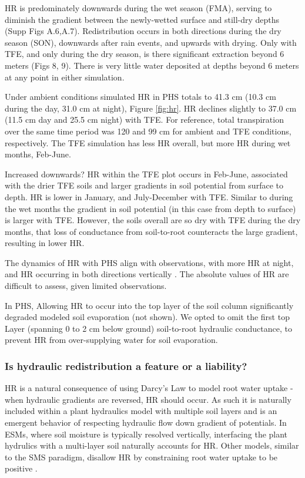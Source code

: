 \documentclass[draft,linenumbers]{agujournal}
\begin{document}
    HR is predominately downwards during the wet season (FMA), serving to diminish the gradient between the newly-wetted surface and still-dry depths (Supp Figs A.6,A.7). Redistribution occurs in both directions during the dry season (SON), downwards after rain events, and upwards with drying. Only with TFE, and only during the dry season, is there significant extraction beyond 6 meters (Figs 8, 9). There is very little water deposited at depths beyond 6 meters at any point in either simulation.
    
    Under ambient conditions simulated HR in PHS totals to 41.3 cm (10.3 cm during the day, 31.0 cm at night), Figure \ref{fig:hr}. HR declines slightly to 37.0 cm (11.5 cm day and 25.5 cm night) with TFE. For reference, total transpiration over the same time period was 120 and 99 cm for ambient and TFE conditions, respectively. The TFE simulation has less HR overall, but more HR during wet months, Feb-June.
    
    Increased downwards? HR within the TFE plot occurs in Feb-June, associated with the drier TFE soils and larger gradients in soil potential from surface to depth. HR is lower in January, and July-December with TFE. Similar to during the wet months the gradient in soil potential (in this case from depth to surface) is larger with TFE. However, the soils overall are so dry with TFE during the dry months, that loss of conductance from soil-to-root counteracts the large gradient, resulting in lower HR.
    
    The dynamics of HR with PHS align with observations, with more HR at night, and HR occurring in both directions vertically \citep{burgess1998}.
    The absolute values of HR are difficult to assess, given limited observations.
    
    In PHS, Allowing HR to occur into the top layer of the soil column significantly degraded modeled soil evaporation (not shown). We opted to omit the first top Layer (spanning 0 to 2 cm below ground) soil-to-root hydraulic conductance, to prevent HR from over-supplying water for soil evaporation.
    
\subsubsection{Is hydraulic redistribution a feature or a liability?}
   
    HR is a natural consequence of using Darcy's Law to model root water uptake - when hydraulic gradients are reversed, HR should occur. As such it is naturally included within a plant hydraulics model with multiple soil layers and is an emergent behavior of respecting hydraulic flow down gradient of potentials.  In ESMs, where soil moisture is typically resolved vertically, interfacing the plant hydrulics with a multi-layer soil naturally accounts for HR. Other models, similar to the SMS paradigm, disallow HR by constraining root water uptake to be positive \citep{xu2016}.
    
\end{document}
